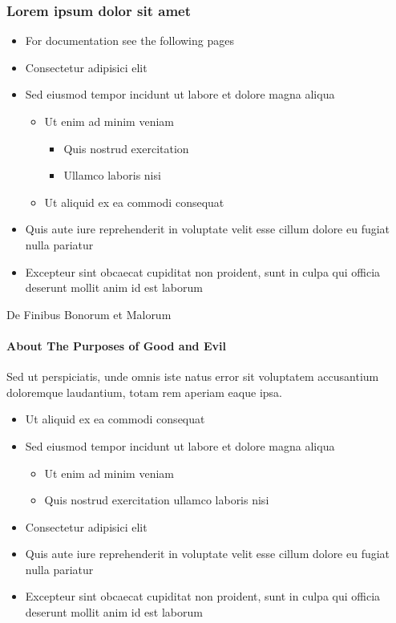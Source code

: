 
\begin{frame}[t,plain]
\titlepage
\end{frame}

\begin{frame}[t]
\frametitle{Lorem ipsum dolor sit amet}

\begin{itemize}
\item For documentation see the following pages
\item Consectetur adipisici elit
\item Sed eiusmod tempor incidunt ut labore et dolore magna aliqua
  \begin{itemize}
  \item Ut enim ad minim veniam
    \begin{itemize}
    \item Quis nostrud exercitation
    \item Ullamco laboris nisi
    \end{itemize}
  \item Ut aliquid ex ea commodi consequat
  \end{itemize}
\item Quis aute iure reprehenderit in voluptate velit esse cillum dolore eu
      fugiat nulla pariatur
\item Excepteur sint obcaecat cupiditat non proident, sunt in culpa qui
      officia deserunt mollit anim id est laborum
\end{itemize}

\end{frame}

\begin{frame}[t]{De Finibus Bonorum et Malorum}
\framesubtitle{About The Purposes of Good and Evil}

Sed ut perspiciatis, unde omnis iste natus error sit voluptatem accusantium
doloremque laudantium, totam rem aperiam eaque ipsa.

\begin{itemize}
\item Ut aliquid ex ea commodi consequat
\item Sed eiusmod tempor incidunt ut labore et dolore magna aliqua
  \begin{itemize}
  \item Ut enim ad minim veniam
  \item Quis nostrud exercitation ullamco laboris nisi
  \end{itemize}
\item Consectetur adipisici elit
\item Quis aute iure reprehenderit in voluptate velit esse cillum dolore eu
      fugiat nulla pariatur
\item Excepteur sint obcaecat cupiditat non proident, sunt in culpa qui
      officia deserunt mollit anim id est laborum
\end{itemize}

\end{frame}

